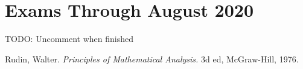 \documentclass[english]{article}
\theoremstyle{definition}
\begin{document}
\pagebreak

\section{Exams Through August 2020}
TODO: Uncomment when finished
% 

\pagebreak

\begin{thebibliography}{9}
    Rudin, Walter. \textit{Principles of Mathematical Analysis.} 3d ed, McGraw-Hill, 1976.
\end{thebibliography}
\end{document}
